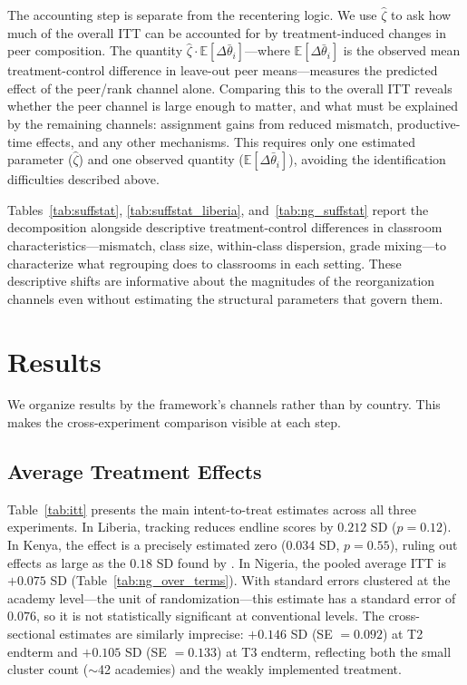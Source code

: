 \documentclass[11pt]{article}
\newcommand{\E}{\mathbb{E}}
\begin{document}
The accounting step is separate from the recentering logic. We use $\hat{\zeta}$ to ask how much of the overall ITT can be accounted for by treatment-induced changes in peer composition. The quantity $\hat{\zeta} \cdot \E[\Delta\bar{\theta}_i]$---where $\E[\Delta\bar{\theta}_i]$ is the observed mean treatment-control difference in leave-out peer means---measures the predicted effect of the peer/rank channel alone. Comparing this to the overall ITT reveals whether the peer channel is large enough to matter, and what must be explained by the remaining channels: assignment gains from reduced mismatch, productive-time effects, and any other mechanisms. This requires only one estimated parameter ($\hat{\zeta}$) and one observed quantity ($\E[\Delta\bar{\theta}_i]$), avoiding the identification difficulties described above.

Tables~\ref{tab:suffstat}, \ref{tab:suffstat_liberia}, and~\ref{tab:ng_suffstat} report the decomposition alongside descriptive treatment-control differences in classroom characteristics---mismatch, class size, within-class dispersion, grade mixing---to characterize what regrouping does to classrooms in each setting. These descriptive shifts are informative about the magnitudes of the reorganization channels even without estimating the structural parameters that govern them.

\section{Results}
\label{sec:results}

We organize results by the framework's channels rather than by country. This makes the cross-experiment comparison visible at each step.

\subsection{Average Treatment Effects}

Table~\ref{tab:itt} presents the main intent-to-treat estimates across all three experiments. In Liberia, tracking reduces endline scores by $0.212$ SD ($p = 0.12$). In Kenya, the effect is a precisely estimated zero ($0.034$ SD, $p = 0.55$), ruling out effects as large as the $0.18$ SD found by \citet{duflo2011peer}. In Nigeria, the pooled average ITT is $+0.075$ SD (Table~\ref{tab:ng_over_terms}). With standard errors clustered at the academy level---the unit of randomization---this estimate has a standard error of $0.076$, so it is not statistically significant at conventional levels. The cross-sectional estimates are similarly imprecise: $+0.146$ SD (SE $= 0.092$) at T2 endterm and $+0.105$ SD (SE $= 0.133$) at T3 endterm, reflecting both the small cluster count ($\sim$42 academies) and the weakly implemented treatment.
\end{document}
